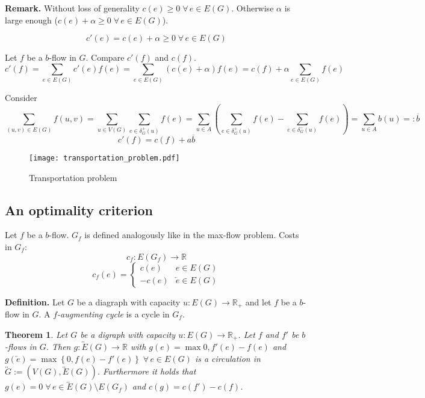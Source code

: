 \documentclass{article}
\newtheorem{theorem}{Theorem}
\newcommand{\set}[1]{\left\{#1\right\}}
\newcommand{\fall}{\;\forall\,}
\begin{document}
\textbf{Remark.}
  Without loss of generality $c(e) \geq 0 \fall e \in E(G)$.
  Otherwise $\alpha$ is large enough ($c(e) + \alpha \geq 0 \fall e \in E(G)$).

\[ c'(e) = c(e) + \alpha \geq 0 \fall e \in E(G) \]

Let $f$ be a $b$-flow in $G$. Compare $c'(f)$ and $c(f)$.
\[
  c'(f)
    = \sum_{e \in E(G)} c'(e) f(e)
    = \sum_{e \in E(G)} (c(e) + \alpha) f(e)
    = c(f) + \alpha \sum_{e \in E(G)} f(e)
\]

Consider
\[
  \sum_{(u,v) \in E(G)} f(u,v)
    = \sum_{u \in V(G)} \sum_{e \in \delta^+_G(u)} f(e)
    = \sum_{u \in A} \left( \sum_{e \in \delta^+_G(u)} f(e) - \sum_{e \in \delta^-_G(u)} f(e) \right)
    = \sum_{u \in A} b(u) =: \overline{b}
\] \[
  c'(f) = c(f) + a\overline{b}
\]

\begin{figure}[h]
 \begin{center}
  \texttt{[image: transportation\_problem.pdf]}
  \caption{Transportation problem}
 \end{center}
\end{figure}

\subsection{An optimality criterion}
%
Let $f$ be a $b$-flow. $G_f$ is defined analogously like in the max-flow problem. Costs in $G_f$:
\[
  c_f: E(G_f) \rightarrow \mathbb{R}
\] \[
  c_f(e) = \begin{cases}
    c(e) & e \in E(G) \\
    -c(e) & \overleftarrow{e} \in E(G)
  \end{cases}
\]

\textbf{Definition.}
  Let $G$ be a diagraph with capacity $u: E(G) \rightarrow \mathbb{R}_+$ and let $f$ be a $b$-flow in $G$.
  A \emph{$f$-augmenting cycle} is a cycle in $G_f$.

\begin{theorem}\label{proposition-5.1}
  Let $G$ be a digraph with capacity $u: E(G) \rightarrow \mathbb{R}_+$. Let $f$ and $f'$ be $b$-flows in $G$. Then $g: \overleftrightarrow{E}(G) \rightarrow \mathbb{R}$ with $g(e) = \max{0,f'(e) - f(e)}$ and $g(\overleftarrow{e}) = \max\set{0, f(e) - f'(e)} \fall e \in E(G)$ is a \emph{circulation} in $\overleftrightarrow{G} := (V(G), \overleftrightarrow{E}(G))$. Furthermore it holds that $g(e) = 0 \fall e \in \overleftrightarrow E(G) \setminus E(G_f)$ and $c(g) = c(f') - c(f)$.
\end{theorem}
\end{document}
